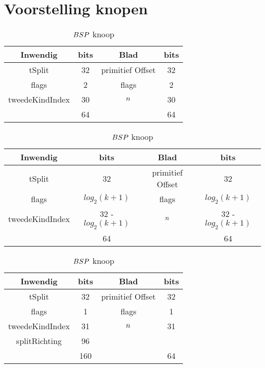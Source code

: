 \section{Voorstelling knopen}
\label{sec:h4-voorstelling-knopen}
    \begin{table}[tb]
        \begin{subtable}{1\textwidth}
        \centering
        \begin{tabular}{@{}|c|c|c|c|@{}} \toprule      
        Inwendig & bits & Blad & bits \\ \midrule
        tSplit & 32 & primitief Offset & 32 \\
        flags  & 2  &  flags   & 2    \\
        tweedeKindIndex & 30 & $n$ & 30 \\ \hline \hline
        & 64 & & 64    \\ \bottomrule
        \end{tabular}
        \caption{$\symKd$ knoop}
        \label{tab:voorstelling-kd-knoop}
        \end{subtable}

        \bigskip
        \begin{subtable}{1\textwidth}
            \centering
            \begin{tabular}{@{}|c|c|c|c|@{}} \toprule      
            Inwendig & bits & Blad & bits \\ \midrule
            tSplit & 32 & primitief Offset & 32 \\
            flags  & $log_2(k + 1)$  &  flags   & $log_2(k + 1)$   \\
            tweedeKindIndex & 32 - $log_2(k + 1)$ & $n$ & 32 - $log_2(k + 1)$ \\ \hline \hline
            & 64 & & 64    \\ \bottomrule
            \end{tabular}
            \caption{$\symRBSP$ en $\symRBSPKd$ knoop}
            \label{tab:voorstelling-rbsp-knoop}
        \end{subtable}

        \bigskip
        \begin{subtable}{1\textwidth}
            \centering
            \begin{tabular}{@{}|c|c|c|c|@{}} \toprule      
                Inwendig & bits & Blad & bits \\ \midrule
                tSplit & 32 & primitief Offset & 32 \\
                flags  & 1  &  flags   & 1    \\
                tweedeKindIndex & 31 & $n$ & 31 \\
                splitRichting & 96 &  &  \\ \hline \hline
                & 160 & & 64    \\ \bottomrule
            \end{tabular}
            \caption{$BSP$ knoop}
            \label{tab:voorstelling-bsp-knoop}
        \end{subtable}


\end{table}
